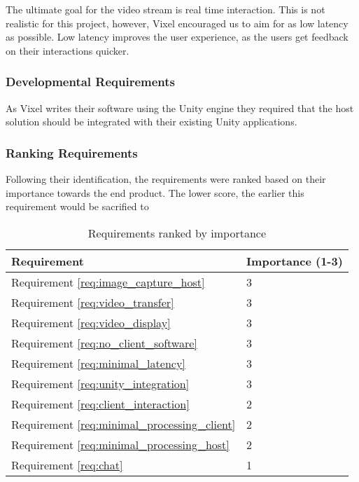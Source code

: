 The ultimate goal for the video stream is real time interaction. This is not realistic for this project, however, Vixel encouraged us to aim for as low latency as possible. Low latency improves the user experience, as the users get feedback on their interactions quicker.

\subsubsection{Developmental Requirements}
As Vixel writes their software using the Unity engine they required that the host solution should be integrated with their existing Unity applications.

\subsubsection{Ranking Requirements}
Following their identification, the requirements were ranked based on their importance towards the end product. The lower score, the earlier this requirement would be sacrified to 

\begin{table}[]
    \centering
    \begin{tabular}{ | l | l |}
        \hline
        Requirement & Importance (1-3) \\
        \hline
        Requirement \ref{req:image_capture_host}            & 3                 \\
        Requirement \ref{req:video_transfer}                & 3                 \\
        Requirement \ref{req:video_display}                 & 3                 \\
        Requirement \ref{req:no_client_software}            & 3                 \\
        Requirement \ref{req:minimal_latency}               & 3                 \\
        Requirement \ref{req:unity_integration}             & 3                 \\
        Requirement \ref{req:client_interaction}            & 2                 \\
        Requirement \ref{req:minimal_processing_client}     & 2                 \\
        Requirement \ref{req:minimal_processing_host}       & 2                 \\
        Requirement \ref{req:chat}                          & 1                 \\
        \hline
    \end{tabular}
    \caption{Requirements ranked by importance}
    \label{tab:requirements_ranking}
\end{table}

